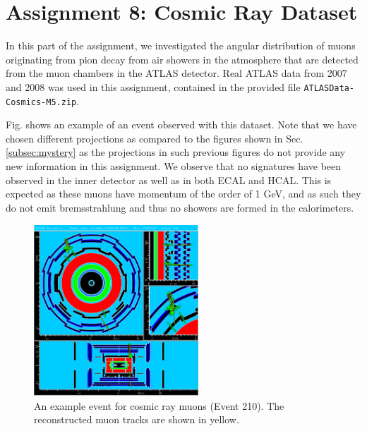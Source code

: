 \documentclass[a4paper]{report}
\numberwithin{equation}{section}
\begin{document}
\section{Assignment 8: Cosmic Ray Dataset}

In this part of the assignment, we investigated the angular distribution 
of muons originating from pion decay from air showers in the atmosphere
that are detected from the muon chambers in the ATLAS detector. Real ATLAS data from 2007 and 
2008 was used in this assignment, contained in the provided file 
\texttt{ATLASData-Cosmics-M5.zip}. \par 

Fig. shows an example of an event observed with this dataset. Note that we have chosen different projections as compared to the figures 
shown in Sec. \ref{subsec:mystery} as the projections in such previous figures do not provide any new information in this assignment.
 We observe that no signatures have been observed in the inner detector as well as in both ECAL and HCAL. This is expected as these muons 
 have momentum of the order of 1 GeV, and as such they do not emit bremsstrahlung and thus no showers are formed in the calorimeters. \par 

\begin{figure}[htpb]
    \centering
    \includegraphics[width=0.55\textwidth]{muon_event210.eps}
    \caption{An example event for cosmic ray muons (Event 210). The reconstructed muon tracks are shown in yellow.}
    \label{fig:crevent210}
\end{figure}
\end{document}
